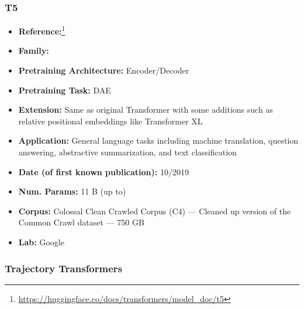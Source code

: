 \documentclass{article}
\begin{document}
\subsubsection{T5}

            \begin{itemize}
                \item \textbf{Reference:}\footnote{\url{https://huggingface.co/docs/transformers/model_doc/t5}}\cite{raffel2020exploring}
                \item \textbf{Family:}  
                \item \textbf{Pretraining Architecture:} Encoder/Decoder
                \item \textbf{Pretraining Task:} DAE
                \item \textbf{Extension:} Same as original Transformer with some additions such as relative positional embeddings like Transformer XL  
                \item \textbf{Application:} General language tasks including machine translation, question answering, abstractive summarization, and text classification
                \item \textbf{Date (of first known publication):} 10/2019
                \item \textbf{Num. Params:} 11 B (up to)
                \item \textbf{Corpus:} Colossal Clean Crawled Corpus (C4) — Cleaned up version of the Common Crawl dataset — 750 GB
                \item \textbf{Lab:} Google
            \end{itemize}
 
\subsubsection{Trajectory Transformers}
\end{document}
